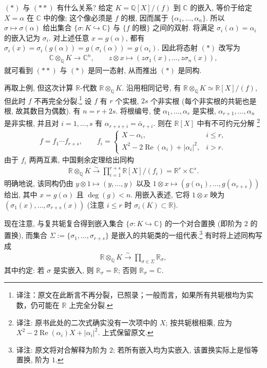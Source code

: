 \begin{example*}
$(*)$ 与 $(**)$ 有什么关系? 给定 $K=\mathbb Q[X]/(f)$ 到 $\mathbb C$ 的嵌入, 等价于给定 $X=\alpha$ 在 $\mathbb C$ 中的像; 这个像必须是 $f$ 的根, 因而属于 $\{\alpha_1,\ldots,\alpha_n\}$. 所以 $\sigma\mapsto\sigma(\alpha)$ 给出集合 $\{\sigma:K\hookrightarrow\mathbb C\}$ 与 $\{f\text{ 的根}\}$ 之间的双射. 将满足 $\sigma_i(\alpha)=\alpha_i$ 的嵌入记为 $\sigma_i$. 对上述任意 $x=g(\alpha)$, 都有 $\sigma_i(x)=\sigma_i(g(\alpha))=g(\sigma_i(\alpha))=g(\alpha_i)$. 因此将态射 $(*)$ 改写为
\begin{align*}
\mathbb C\otimes_{\mathbb Q}K\longrightarrow\mathbb C^n,\qquad
z\otimes x\mapsto(z\sigma_1(x),\ldots,z\sigma_n(x)),
\end{align*}
就可看到 $(**)$ 与 $(*)$ 是同一态射, 从而推出 $(*)$ 是同构.
\end{example*}
\begin{example*}
再取上例, 但这次计算 $\mathbb R$-代数 $\mathbb R\otimes_{\mathbb Q}K$. 沿用相同记号, 有 $\mathbb R\otimes_{\mathbb Q}K\simeq\mathbb R[X]/(f)$, 但此时 $f$ 不再完全分裂.\footnote{译注：原文在此断言不再分裂，已照录；一般而言，如果所有共轭根均为实数，仍可能在 $\mathbb R$ 上完全分裂.} 设 $f$ 有 $r$ 个实根, $2s$ 个非实根 (每个非实根的共轭也是根, 故其数目为偶数). 有 $n=r+2s$. 将根编号, 使 $\alpha_1,\ldots,\alpha_r$ 是实根, $\alpha_{r+1},\ldots,\alpha_n$ 是非实根, 并且对 $i=1,\ldots,s$ 有 $\alpha_{r+s+i}=\bar\alpha_{r+i}$. 则在 $\mathbb R[X]$ 中有不可约元分解
\footnote{译注: 原书此处的二次式确实没有一次项中的 $X$; 按共轭根相乘, 应为 $X^2-2\operatorname{Re}(\alpha_i)X+|\alpha_i|^2$. 上式保留原文.}
\begin{align*}
f=f_1\cdots f_{r+s},\qquad
f_i=\begin{cases}
X-\alpha_i,&i\le r,\\
X^2-2\operatorname{Re}(\alpha_i)+|\alpha_i|^2,&i>r.
\end{cases}
\end{align*}
由于 $f_i$ 两两互素, 中国剩余定理给出同构
\begin{align*}
\mathbb R\otimes_{\mathbb Q}K\xrightarrow{\sim}\prod_{i=1}^{r+s}\mathbb R[X]/(f_i)=\mathbb R^r\times\mathbb C^s.
\end{align*}
明确地说, 该同构仍由 $y\otimes1\mapsto(y,\ldots,y)$ 以及 $1\otimes x\mapsto(g(\alpha_1),\ldots,g(\alpha_{r+s}))$ 给出, 其中 $x=g(\alpha)$ 且 $\deg(g)<n$. 用嵌入表述, 它将 $1\otimes x$ 映为 $(\sigma_1(x),\ldots,\sigma_{r+s}(x))$ (注意 $i\le r$ 时 $\sigma_i(K)\subset\mathbb R$).

现在注意, 与复共轭复合得到嵌入集合 $\{\sigma:K\hookrightarrow\mathbb C\}$ 的一个对合置换 (即阶为 $2$ 的置换), 而集合 $\Sigma:=\{\sigma_1,\ldots,\sigma_{r+s}\}$ 是嵌入的共轭类的一组代表.\footnote{译注: 原文将对合解释为阶为 $2$; 若所有嵌入均为实嵌入, 该置换实际上是恒等置换, 阶为 $1$.} 有时将上述同构写成
\begin{align*}
\mathbb R\otimes_{\mathbb Q}K\xrightarrow{\sim}\prod_{\sigma\in\Sigma}\mathbb R_\sigma,
\end{align*}
其中约定: 若 $\sigma$ 是实嵌入, 则 $\mathbb R_\sigma=\mathbb R$; 否则 $\mathbb R_\sigma=\mathbb C$.
\end{example*}

